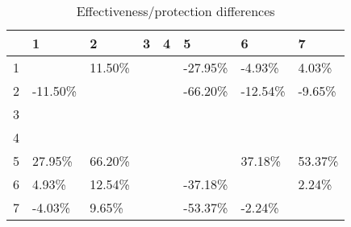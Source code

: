 \begin{table}[ht]
\centering
\begin{tabular}{rlllllll}
  \hline
 & 1 & 2 & 3 & 4 & 5 & 6 & 7 \\ 
  \hline
1 &  & 11.50\% &  &  & -27.95\% & -4.93\% & 4.03\% \\ 
  2 & -11.50\% &  &  &  & -66.20\% & -12.54\% & -9.65\% \\ 
  3 &  &  &  &  &  &  &  \\ 
  4 &  &  &  &  &  &  &  \\ 
  5 & 27.95\% & 66.20\% &  &  &  & 37.18\% & 53.37\% \\ 
  6 & 4.93\% & 12.54\% &  &  & -37.18\% &  & 2.24\% \\ 
  7 & -4.03\% & 9.65\% &  &  & -53.37\% & -2.24\% &  \\ 
   \hline
\end{tabular}
\caption{Effectiveness/protection differences} 
\end{table}
